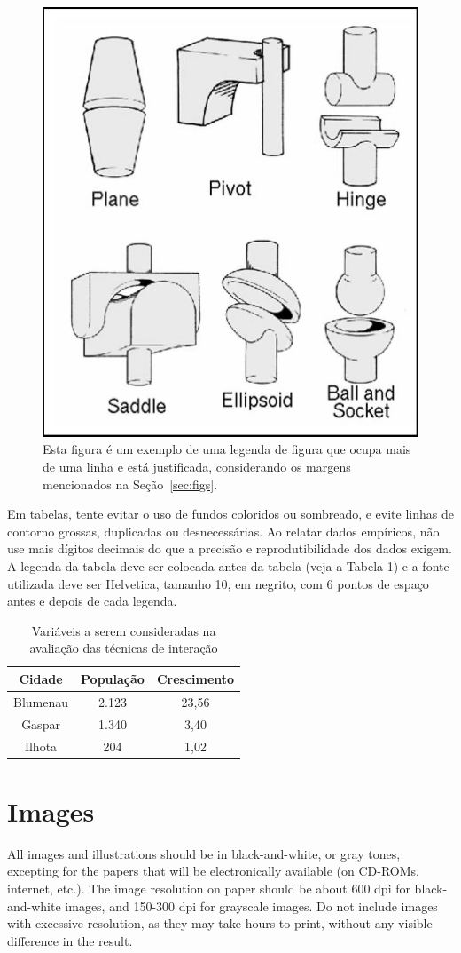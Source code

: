\documentclass[12pt]{article}
\begin{document}
\begin{figure}[ht]
\centering
\includegraphics[width=.3\textwidth]{fig2.jpg}
\caption{Esta figura é um exemplo de uma legenda de figura que ocupa mais de uma linha e 
está justificada, considerando os margens mencionados na Seção~\ref{sec:figs}.}
\label{fig:exampleFig2}
\end{figure}

Em tabelas, tente evitar o uso de fundos coloridos ou sombreado, e evite linhas de contorno 
grossas, duplicadas ou desnecessárias. Ao relatar dados empíricos, não use mais dígitos decimais 
do que a precisão e reprodutibilidade dos dados exigem. A legenda da tabela deve ser colocada 
antes da tabela (veja a Tabela 1) e a fonte utilizada deve ser Helvetica, tamanho 10, em negrito, 
com 6 pontos de espaço antes e depois de cada legenda.

\begin{table}[ht]
  \centering
  \caption{Variáveis a serem consideradas na avaliação das técnicas de interação}
  \label{tab:exTable1}
  \begin{tabular}{|c|c|c|}
    \hline
    \textbf{Cidade} & \textbf{População} & \textbf{Crescimento} \\
    \hline
    Blumenau & 2.123 & 23,56 \\
    Gaspar & 1.340 & 3,40 \\
    Ilhota & 204 & 1,02 \\
    \hline
  \end{tabular}
\end{table}
    
\section{Images}

All images and illustrations should be in black-and-white, or gray tones,
excepting for the papers that will be electronically available (on CD-ROMs,
internet, etc.). The image resolution on paper should be about 600 dpi for
black-and-white images, and 150-300 dpi for grayscale images.  Do not include
images with excessive resolution, as they may take hours to print, without any
visible difference in the result. 
\end{document}
